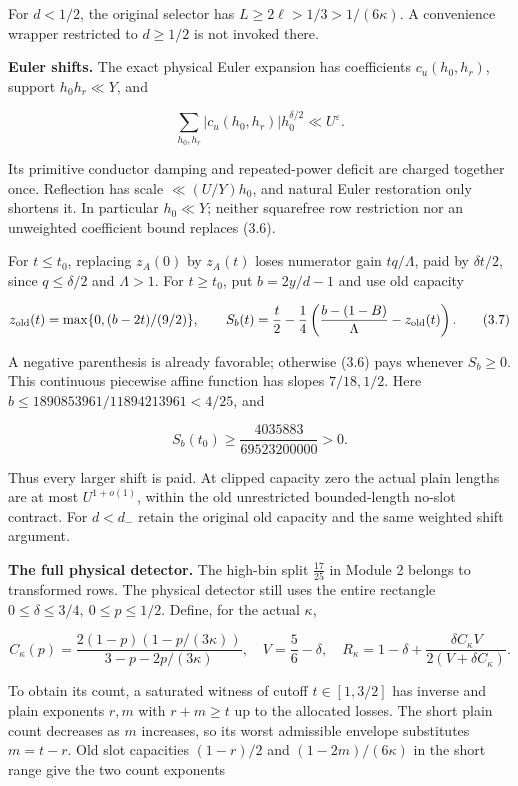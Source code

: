 \documentclass[11pt,a4paper]{article}
\begin{document}
For \(d<1/2\), the original selector has \(L\ge2\ell>1/3>1/(6\kappa)\).
A convenience wrapper restricted to \(d\ge1/2\) is not invoked there.

\textbf{Euler shifts.} The exact physical Euler expansion has
coefficients \(c_u(h_0,h_r)\), support \(h_0h_r\ll Y\), and

\[
\sum_{h_0,h_r}|c_u(h_0,h_r)|h_0^{\delta/2}\ll U^\varepsilon.
\tag{3.6}
\]

Its primitive conductor damping and repeated-power deficit are charged
together once. Reflection has scale \(\ll(U/Y)h_0\), and natural Euler
restoration only shortens it. In particular \(h_0\ll Y\); neither
squarefree row restriction nor an unweighted coefficient bound replaces
(3.6).

For \(t\le t_0\), replacing \(z_A(0)\) by \(z_A(t)\) loses numerator
gain \(tq/\Lambda\), paid by \(\delta t/2\), since \(q\le\delta/2\) and
\(\Lambda>1\). For \(t\ge t_0\), put \(b=2y/d-1\) and use old capacity

\[
z_{\rm old}(t)=\max\{0,(b-2t)/(9/2)\},\qquad
S_b(t)=\frac t2-\frac14
 \left(\frac{b-(1-B)}{\Lambda}-z_{\rm old}(t)\right).
\tag{3.7}
\]

A negative parenthesis is already favorable; otherwise (3.6) pays
whenever \(S_b\ge0\). This continuous piecewise affine function has
slopes \(7/18,1/2\). Here \(b\le1890853961/11894213961<4/25\), and

\[
S_b(t_0)\ge\frac{4035883}{69523200000}>0.
\tag{3.8}
\]

Thus every larger shift is paid. At clipped capacity zero the actual
plain lengths are at most \(U^{1+o(1)}\), within the old unrestricted
bounded-length no-slot contract. For \(d<d_-\) retain the original old
capacity and the same weighted shift argument.

\textbf{The full physical detector.} The high-bin split \(\frac{17}{25}\) in
Module 2 belongs to transformed rows. The physical detector still uses
the entire rectangle \(0\le\delta\le3/4,\ 0\le p\le1/2\). Define, for
the actual \(\kappa\),

\[
C_\kappa(p)=
\frac{2(1-p)(1-p/(3\kappa))}{3-p-2p/(3\kappa)},\quad
V=\frac56-\delta,\quad
R_\kappa=1-\delta+\frac{\delta C_\kappa V}{2(V+\delta C_\kappa)}.
\tag{3.9}
\]

To obtain its count, a saturated witness of cutoff \(t\in[1,3/2]\) has
inverse and plain exponents \(r,m\) with \(r+m\ge t\) up to the
allocated losses. The short plain count decreases as \(m\) increases, so
its worst admissible envelope substitutes \(m=t-r\). Old slot capacities
\((1-r)/2\) and \((1-2m)/(6\kappa)\) in the short range give the two
count exponents
\end{document}

